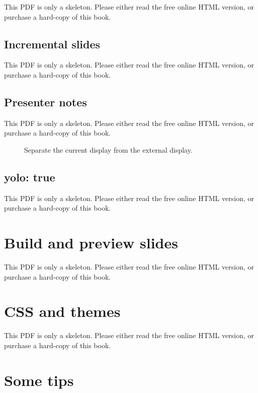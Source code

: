 \documentclass[
  11pt,
]{krantz}
\theoremstyle{definition}
\theoremstyle{definition}
\theoremstyle{definition}
\theoremstyle{definition}
\theoremstyle{remark}
\begin{document}
This PDF is only a skeleton. Please either read the free online HTML version, or purchase a hard-copy of this book.

\subsection{Incremental slides}\label{incremental-slides}

This PDF is only a skeleton. Please either read the free online HTML version, or purchase a hard-copy of this book.

\subsection{Presenter notes}\label{xaringan-notes}

This PDF is only a skeleton. Please either read the free online HTML version, or purchase a hard-copy of this book.

\begin{figure}\caption{Separate the current display from the external display.}\end{figure}

\subsection{yolo: true}\label{yolo-true}

This PDF is only a skeleton. Please either read the free online HTML version, or purchase a hard-copy of this book.

\section{Build and preview slides}\label{xaringan-preview}

This PDF is only a skeleton. Please either read the free online HTML version, or purchase a hard-copy of this book.

\section{CSS and themes}\label{css-and-themes}

This PDF is only a skeleton. Please either read the free online HTML version, or purchase a hard-copy of this book.

\section{Some tips}\label{some-tips}
\end{document}
